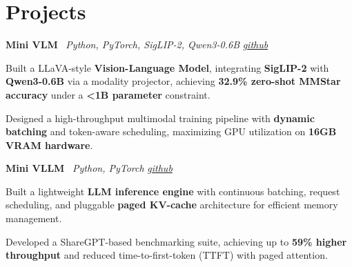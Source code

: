 \section{Projects}

    \hspace{0.5em} \textbf{Mini VLM} \textbar \  \textit{Python, PyTorch, SigLIP-2, Qwen3-0.6B}
\hfill \textit{\href{https://github.com/knarfthekant/mini_vlm}{github}}
    \vspace{0.10 cm}
    \begin{onecolentry}
        \begin{highlights}
            \item Built a LLaVA-style \textbf{Vision-Language Model}, integrating \textbf{SigLIP-2} with \textbf{Qwen3-0.6B} via a modality projector, achieving \textbf{32.9\% zero-shot MMStar accuracy} under a \textbf{<1B parameter} constraint.

            \item Designed a high-throughput multimodal training pipeline with \textbf{dynamic batching} and token-aware scheduling, maximizing GPU utilization on \textbf{16GB VRAM hardware}.

        \end{highlights}
    \end{onecolentry}
    \vspace{0.10 cm}

    \hspace{0.5em} \textbf{Mini VLLM} \textbar \  \textit{Python, PyTorch}
\hfill \textit{\href{https://github.com/knarfthekant/mini_vllm}{github}}
    \vspace{0.10 cm}
    \begin{onecolentry}
        \begin{highlights}
            \item Built a lightweight \textbf{LLM inference engine} with continuous batching, request scheduling, and pluggable \textbf{paged KV-cache} architecture for efficient memory management.

            \item Developed a ShareGPT-based benchmarking suite, achieving up to \textbf{59\% higher throughput} and reduced time-to-first-token (TTFT) with paged attention.

        \end{highlights}
    \end{onecolentry}
    \vspace{0.10 cm}

